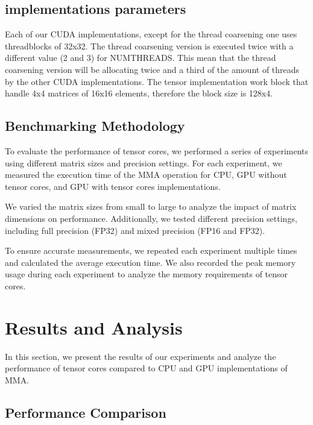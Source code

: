 \documentclass[conference]{IEEEtran}
\begin{document}
  \subsection{implementations parameters}
  Each of our CUDA implementations, except for the thread coarsening one uses threadblocks of 32x32.
  The thread coarsening version is executed twice with a different value (2 and 3) for NUMTHREADS. This
  mean that the thread coarsening version will be allocating twice and a third of the amount of threads
  by the other CUDA implementations. The tensor implementation work block that handle 4x4 matrices of
  16x16 elements, therefore the block size is 128x4.

  \subsection{Benchmarking Methodology}\label{sec:benchmarking-methodology}
  
  To evaluate the performance of tensor cores, we performed a series of experiments using different 
  matrix sizes and precision settings. For each experiment, we measured the execution time of the 
  MMA operation for CPU, GPU without tensor cores, and GPU with tensor cores implementations.
  
  We varied the matrix sizes from small to large to analyze the impact of matrix dimensions on 
  performance. Additionally, we tested different precision settings, including full precision (FP32)
  and mixed precision (FP16 and FP32).
  
  To ensure accurate measurements, we repeated each experiment multiple times and calculated 
  the average execution time. We also recorded the peak memory usage during each experiment to 
  analyze the memory requirements of tensor cores.
  
  \section{Results and Analysis}\label{sec:results-analysis}
  
  In this section, we present the results of our experiments and analyze the performance of 
  tensor cores compared to CPU and GPU implementations of MMA.

  
  \subsection{Performance Comparison}\label{sec:performance-comparison}
\end{document}

